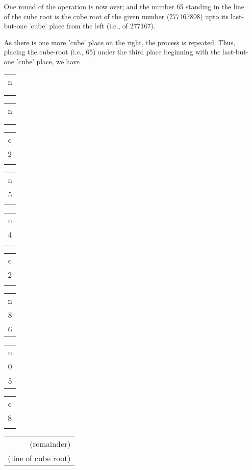 \documentclass[10pt, openany]{book}
\begin{document}
{{{{{{{{{{{{{{{{{{{{\begin{sloppypar}
One round of the operation is now over; and the number 65 standing in the line of the cube root is the cube root of the given number
(277167808) upto its last-but-one 'cube' place from the left (i.e., of
277167).
\vspace{3mm}

 As there is one more 'cube' place on the right, the process is
repeated.
Thus, placing the cube-root (i.e., 65) under the third place beginning
with
the last-but-one 'cube' place, we have
\vspace{3mm}

\hspace{1cm}\begin{tabular}{c} n\\ \\ \\ \end{tabular}
\begin{tabular}{c} n\\ \\ \\ \end{tabular}
\begin{tabular}{c} c\\2\\ \\ \end{tabular}
\begin{tabular}{c} n\\5\\ \\ \end{tabular}
\begin{tabular}{c} n\\4\\ \\ \end{tabular}
\begin{tabular}{c} c\\2\\ \\ \end{tabular}
\begin{tabular}{c} n\\8\\6  \end{tabular}
\begin{tabular}{c} n\\0\\5 \end{tabular}
\begin{tabular}{c} c\\8\\ \\ \end{tabular} \hspace{10mm} \begin{tabular}{r} \\ (remainder)\\ (line of cube root)\\  \end{tabular}
\vspace{3mm}


\end{sloppypar}}}}}}}}}}}}}}}}}}}}}
\end{document}
